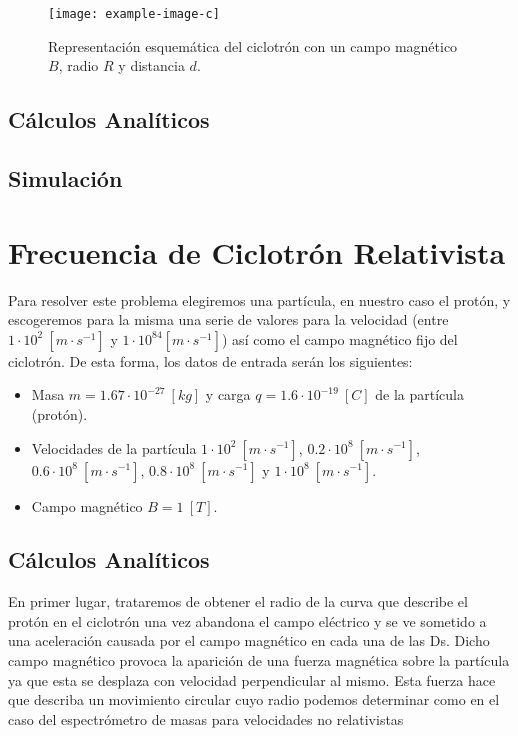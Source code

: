 \documentclass[journal]{IEEEtran}
\begin{document}
\begin{figure}[!htb]
    \texttt{[image: example-image-c]}
    \caption{Representación esquemática del ciclotrón con un campo magnético $B$, radio $R$ y distancia $d$.}
    \label{fig:ciclotron}
\end{figure}

\subsection{Cálculos Analíticos}



\subsection{Simulación}

\clearpage

\section{Frecuencia de Ciclotrón Relativista}
\label{sec:frecuencia}

Para resolver este problema elegiremos una partícula, en nuestro caso el protón, y escogeremos para la misma una serie de valores para la velocidad (entre $1\cdot 10^2~[m\cdot s^{-1}]$ y $1\cdot 10^84[m\cdot s^{-1}]$) así como el campo magnético fijo del ciclotrón. De esta forma, los datos de entrada serán los siguientes:

\begin{itemize}
    \item Masa $m = 1.67\cdot 10^{-27}~[kg]$ y carga $q = 1.6\cdot 10^{-19}~[C]$ de la partícula (protón).
    \item Velocidades de la partícula $1\cdot 10^2~[m\cdot s^{-1}]$, $0.2\cdot 10^8~[m\cdot s^{-1}]$, $0.6\cdot 10^8~[m\cdot s^{-1}]$, $0.8\cdot 10^8~[m\cdot s^{-1}]$ y $1\cdot 10^8~[m\cdot s^{-1}]$.
    \item Campo magnético $B = 1~[T]$.
\end{itemize}

\subsection{Cálculos Analíticos}

En primer lugar, trataremos de obtener el radio de la curva que describe el protón en el ciclotrón una vez abandona el campo eléctrico y se ve sometido a una aceleración causada por el campo magnético en cada una de las Ds. Dicho campo magnético provoca la aparición de una fuerza magnética sobre la partícula ya que esta se desplaza con velocidad perpendicular al mismo. Esta fuerza hace que describa un movimiento circular cuyo radio podemos determinar como en el caso del espectrómetro de masas para velocidades no relativistas
\end{document}
